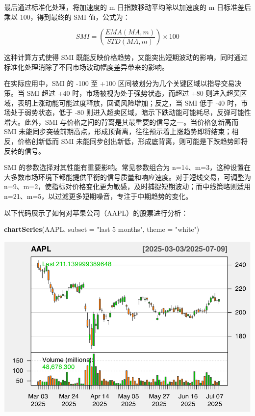 \documentclass[]{ctexbook}
\newenvironment{Shaded}{\begin{snugshade}}{\end{snugshade}}
\newcommand{\AttributeTok}[1]{\textcolor[rgb]{0.13,0.29,0.53}{#1}}
\newcommand{\FunctionTok}[1]{\textcolor[rgb]{0.13,0.29,0.53}{\textbf{#1}}}
\newcommand{\NormalTok}[1]{#1}
\newcommand{\StringTok}[1]{\textcolor[rgb]{0.31,0.60,0.02}{#1}}
\begin{document}
最后通过标准化处理，将加速度的 m 日指数移动平均除以加速度的 m 日标准差后乘以 100，得到最终的 SMI 值，公式为：

\[ 
SMI = \left( \frac{EMA(MA, m)}{STD(MA, m)} \right) \times 100
\]

这种计算方式使得 SMI 既能反映价格趋势，又能突出短期波动的影响，同时通过标准化处理消除了不同市场波动幅度差异带来的影响。

在实际应用中，SMI 的 -100 至 +100 区间被划分为几个关键区域以指导交易决策。当 SMI 超过 +40 时，市场被视为处于强势状态，而超过 +80 则进入超买区域，表明上涨动能可能过度释放，回调风险增加；反之，当 SMI 低于 -40 时，市场处于弱势状态，低于 -80 则进入超卖区域，暗示下跌动能可能耗尽，反弹可能性增大。此外，SMI 与价格之间的背离是其最重要的信号之一。当价格创新高而 SMI 未能同步突破前期高点，形成顶背离，往往预示着上涨趋势即将结束；相反，价格创新低而 SMI 未能同步创出新低，形成底背离，则可能是下跌趋势即将反转的信号。

SMI 的参数选择对其性能有重要影响。常见参数组合为 n=14、m=3，这种设置在大多数市场环境下都能提供平衡的信号质量和响应速度。对于短线交易，可调整为 n=9、m=2，使指标对价格变化更为敏感，及时捕捉短期波动；而中线策略则适用 n=21、m=5，以过滤更多短期噪音，专注于中期趋势的变化。

以下代码展示了如何对苹果公司（AAPL）的股票进行分析：

\begin{Shaded}
\begin{Highlighting}[]
\FunctionTok{chartSeries}\NormalTok{(AAPL, }\AttributeTok{subset =} \StringTok{"last 5 months"}\NormalTok{, }\AttributeTok{theme =} \StringTok{"white"}\NormalTok{)}
\end{Highlighting}
\end{Shaded}

\includegraphics[width=0.9\linewidth]{quantmod_files/figure-latex/smi-1}
\end{document}
